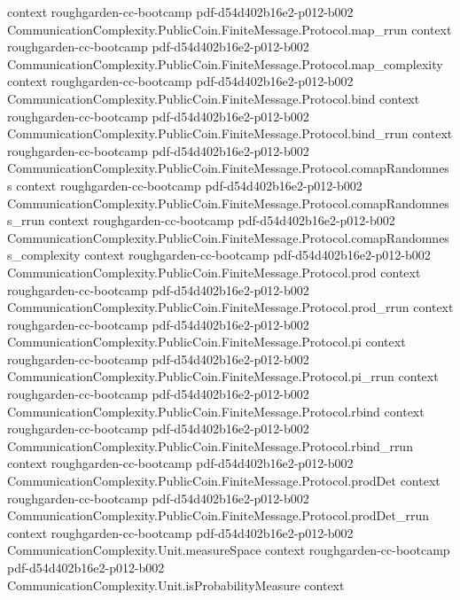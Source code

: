 \begin{theorem}
  {context}
  {roughgarden-cc-bootcamp}
  {pdf-d54d402b16e2-p012-b002}
\proofstep
  {CommunicationComplexity.PublicCoin.FiniteMessage.Protocol.map_rrun}
  {context}
  {roughgarden-cc-bootcamp}
  {pdf-d54d402b16e2-p012-b002}
\proofstep
  {CommunicationComplexity.PublicCoin.FiniteMessage.Protocol.map_complexity}
  {context}
  {roughgarden-cc-bootcamp}
  {pdf-d54d402b16e2-p012-b002}
\proofstep
  {CommunicationComplexity.PublicCoin.FiniteMessage.Protocol.bind}
  {context}
  {roughgarden-cc-bootcamp}
  {pdf-d54d402b16e2-p012-b002}
\proofstep
  {CommunicationComplexity.PublicCoin.FiniteMessage.Protocol.bind_rrun}
  {context}
  {roughgarden-cc-bootcamp}
  {pdf-d54d402b16e2-p012-b002}
\proofstep
  {CommunicationComplexity.PublicCoin.FiniteMessage.Protocol.comapRandomness}
  {context}
  {roughgarden-cc-bootcamp}
  {pdf-d54d402b16e2-p012-b002}
\proofstep
  {CommunicationComplexity.PublicCoin.FiniteMessage.Protocol.comapRandomness_rrun}
  {context}
  {roughgarden-cc-bootcamp}
  {pdf-d54d402b16e2-p012-b002}
\proofstep
  {CommunicationComplexity.PublicCoin.FiniteMessage.Protocol.comapRandomness_complexity}
  {context}
  {roughgarden-cc-bootcamp}
  {pdf-d54d402b16e2-p012-b002}
\proofstep
  {CommunicationComplexity.PublicCoin.FiniteMessage.Protocol.prod}
  {context}
  {roughgarden-cc-bootcamp}
  {pdf-d54d402b16e2-p012-b002}
\proofstep
  {CommunicationComplexity.PublicCoin.FiniteMessage.Protocol.prod_rrun}
  {context}
  {roughgarden-cc-bootcamp}
  {pdf-d54d402b16e2-p012-b002}
\proofstep
  {CommunicationComplexity.PublicCoin.FiniteMessage.Protocol.pi}
  {context}
  {roughgarden-cc-bootcamp}
  {pdf-d54d402b16e2-p012-b002}
\proofstep
  {CommunicationComplexity.PublicCoin.FiniteMessage.Protocol.pi_rrun}
  {context}
  {roughgarden-cc-bootcamp}
  {pdf-d54d402b16e2-p012-b002}
\proofstep
  {CommunicationComplexity.PublicCoin.FiniteMessage.Protocol.rbind}
  {context}
  {roughgarden-cc-bootcamp}
  {pdf-d54d402b16e2-p012-b002}
\proofstep
  {CommunicationComplexity.PublicCoin.FiniteMessage.Protocol.rbind_rrun}
  {context}
  {roughgarden-cc-bootcamp}
  {pdf-d54d402b16e2-p012-b002}
\proofstep
  {CommunicationComplexity.PublicCoin.FiniteMessage.Protocol.prodDet}
  {context}
  {roughgarden-cc-bootcamp}
  {pdf-d54d402b16e2-p012-b002}
\proofstep
  {CommunicationComplexity.PublicCoin.FiniteMessage.Protocol.prodDet_rrun}
  {context}
  {roughgarden-cc-bootcamp}
  {pdf-d54d402b16e2-p012-b002}
\proofstep
  {CommunicationComplexity.Unit.measureSpace}
  {context}
  {roughgarden-cc-bootcamp}
  {pdf-d54d402b16e2-p012-b002}
\proofstep
  {CommunicationComplexity.Unit.isProbabilityMeasure}
  {context}

\end{theorem}
